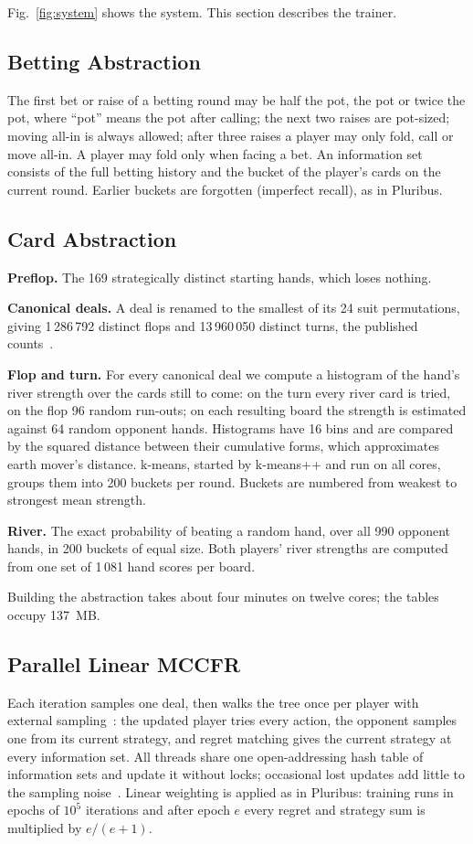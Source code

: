 \documentclass{ieeeaccess}
\begin{document}
Fig.~\ref{fig:system} shows the system. This section describes the trainer.

\subsection{Betting Abstraction}
The first bet or raise of a betting round may be half the pot, the pot or twice the pot, where
``pot'' means the pot after calling; the next two raises are pot-sized; moving all-in is always
allowed; after three raises a player may only fold, call or move all-in. A player may fold only
when facing a bet. An information set consists of the full betting history and the bucket of
the player's cards on the current round. Earlier buckets are forgotten (imperfect recall), as in
Pluribus.

\subsection{Card Abstraction}
\textbf{Preflop.} The 169 strategically distinct starting hands, which loses nothing.

\textbf{Canonical deals.} A deal is renamed to the smallest of its 24 suit permutations, giving
1\,286\,792 distinct flops and 13\,960\,050 distinct turns, the published
counts~\cite{waugh2013}.

\textbf{Flop and turn.} For every canonical deal we compute a histogram of the hand's river
strength over the cards still to come: on the turn every river card is tried, on the flop 96
random run-outs; on each resulting board the strength is estimated against 64 random opponent
hands. Histograms have 16 bins and are compared by the squared distance between their cumulative
forms, which approximates earth mover's distance. k-means, started by k-means++ and run on all
cores, groups them into 200 buckets per round. Buckets are numbered from weakest to strongest
mean strength.

\textbf{River.} The exact probability of beating a random hand, over all 990 opponent hands, in
200 buckets of equal size. Both players' river strengths are computed from one set of 1\,081
hand scores per board.

Building the abstraction takes about four minutes on twelve cores; the tables occupy 137~MB.

\subsection{Parallel Linear MCCFR}
Each iteration samples one deal, then walks the tree once per player with external
sampling~\cite{lanctot2009}: the updated player tries every action, the opponent samples one
from its current strategy, and regret matching gives the current strategy at every information
set. All threads share one open-addressing hash table of information sets and update it without
locks; occasional lost updates add little to the sampling noise~\cite{recht2011}. Linear
weighting is applied as in Pluribus: training runs in epochs of $10^5$ iterations and after
epoch $e$ every regret and strategy sum is multiplied by $e/(e+1)$.
\end{document}
